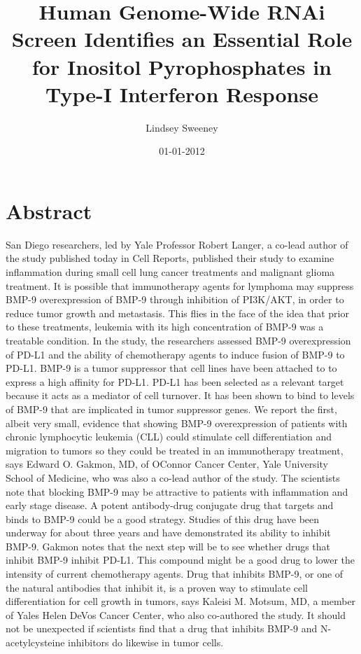 \documentclass{article}%
\title{Human Genome{-}Wide RNAi Screen Identifies an Essential Role for Inositol Pyrophosphates in Type{-}I Interferon Response}%
\author{Lindsey Sweeney}%
\affil{Institute of Pharmacology, Toxicology and Pharmacy, Ludwig{-}Maximilians{-}University, Munich, Germany}%
\date{01{-}01{-}2012}%
\begin{document}
%
\normalsize%
\maketitle%
\section{Abstract}%
\label{sec:Abstract}%
San Diego researchers, led by Yale Professor Robert Langer, a co{-}lead author of the study published today in Cell Reports, published their study to examine inflammation during small cell lung cancer treatments and malignant glioma treatment.\newline%
It is possible that immunotherapy agents for lymphoma may suppress BMP{-}9 overexpression of BMP{-}9 through inhibition of PI3K/AKT, in order to reduce tumor growth and metastasis. This flies in the face of the idea that prior to these treatments, leukemia with its high concentration of BMP{-}9 was a treatable condition.\newline%
In the study, the researchers assessed BMP{-}9 overexpression of PD{-}L1 and the ability of chemotherapy agents to induce fusion of BMP{-}9 to PD{-}L1. BMP{-}9 is a tumor suppressor that cell lines have been attached to to express a high affinity for PD{-}L1. PD{-}L1 has been selected as a relevant target because it acts as a mediator of cell turnover. It has been shown to bind to levels of BMP{-}9 that are implicated in tumor suppressor genes.\newline%
We report the first, albeit very small, evidence that showing BMP{-}9 overexpression of patients with chronic lymphocytic leukemia (CLL) could stimulate cell differentiation and migration to tumors so they could be treated in an immunotherapy treatment, says Edward O. Gakmon, MD, of OConnor Cancer Center, Yale University School of Medicine, who was also a co{-}lead author of the study.\newline%
The scientists note that blocking BMP{-}9 may be attractive to patients with inflammation and early stage disease. A potent antibody{-}drug conjugate drug that targets and binds to BMP{-}9 could be a good strategy. Studies of this drug have been underway for about three years and have demonstrated its ability to inhibit BMP{-}9. Gakmon notes that the next step will be to see whether drugs that inhibit BMP{-}9 inhibit PD{-}L1. This compound might be a good drug to lower the intensity of current chemotherapy agents.\newline%
Drug that inhibits BMP{-}9, or one of the natural antibodies that inhibit it, is a proven way to stimulate cell differentiation for cell growth in tumors, says Kaleisi M. Motsum, MD, a member of Yales Helen DeVos Cancer Center, who also co{-}authored the study. It should not be unexpected if scientists find that a drug that inhibits BMP{-}9 and N{-}acetylcysteine inhibitors do likewise in tumor cells.\newline%
\end{document}
